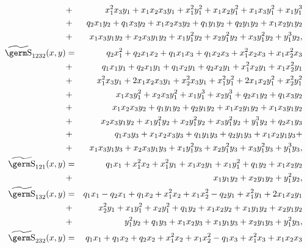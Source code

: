 {{\begin{eqnarray*}
 &+ & x_1^2 x_3 y_1 + 
  x_1 x_2 x_3 y_1 + x_1^2 y_1^2 + 
  x_1 x_2 y_1^2 + x_1 x_3 y_1^2 + x_1 y_1^3 \\ 
 &+ & q_2 x_1 y_2 + 
  q_1 x_3 y_2 + x_1 x_2 x_3 y_2 +  q_1 y_1 y_2 + q_2 y_1 y_2 + 
  x_1 x_2 y_1 y_2\\ 
 &+ & x_1 x_3 y_1 y_2 + 
  x_2 x_3 y_1 y_2 + x_1 y_1^2 y_2 + x_2 y_1^2 y_2 + 
  x_3 y_1^2 y_2 + y_1^3 y_2,\\ 
\wt{\s}_{1232}(x,y) & = & q_2 x_1^2 + q_2 x_1 x_2 + 
  q_1 x_1 x_3 + q_1 x_2 x_3 + 
  x_1^2 x_2 x_3 + x_1 x_2^2 x_3\\ 
 &+ & q_1 x_1 y_1 + q_2 x_1 y_1 + 
  q_1 x_2 y_1 + q_2 x_2 y_1 + x_1^2 x_2 y_1 + x_1 x_2^2 y_1\\ 
 &+ &  x_1^2 x_3 y_1 + 2 x_1 x_2 x_3 y_1 + 
  x_2^2 x_3 y_1 + x_1^2 y_1^2 + 
  2 x_1 x_2 y_1^2 + x_2^2 y_1^2\\ 
 &+ &  x_1 x_3 y_1^2 + x_2 x_3 y_1^2 + x_1 y_1^3 + x_2 y_1^3 + 
  q_2 x_1 y_2 + q_1 x_3 y_2  \\ 
 &+ & x_1 x_2 x_3 y_2 + q_1 y_1 y_2 + 
  q_2 y_1 y_2 + x_1 x_2 y_1 y_2 + 
  x_1 x_3 y_1 y_2  \\ 
 &+ & x_2 x_3 y_1 y_2 + x_1 y_1^2 y_2 + x_2 y_1^2 y_2 + 
  x_3 y_1^2 y_2 + y_1^3 y_2 + 
  q_2 x_1 y_3  \\ 
 &+ & q_1 x_3 y_3 + 
  x_1 x_2 x_3 y_3 + q_1 y_1 y_3 + 
  q_2 y_1 y_3 + x_1 x_2 y_1 y_3 + \\ 
 &+ &  x_1 x_3 y_1 y_3 + 
  x_2 x_3 y_1 y_3 + 
  x_1 y_1^2 y_3 + x_2 y_1^2 y_3 + 
  x_3 y_1^2 y_3 + y_1^3 y_3, \\ 
\wt{\s}_{121}(x,y) & = & q_1 x_1 + x_1^2 x_2 + x_1^2 y_1 + 
  x_1 x_2 y_1 + x_1 y_1^2 + 
  q_1 y_2 + x_1 x_2 y_2 \\ 
 &+ & x_1 y_1 y_2 + x_2 y_1 y_2 + 
  y_1^2 y_2, \\
\wt{\s}_{132}(x,y) & = & q_1 x_1 - q_2 x_1 + q_1 x_2 + 
  x_1^2 x_2 + x_1 x_2^2 - q_2 y_1 + x_1^2 y_1 + 2 x_1 x_2 y_1\\ 
 &+ &  x_2^2 y_1 + x_1 y_1^2 + 
  x_2 y_1^2 + q_1 y_2 +  x_1 x_2 y_2 + x_1 y_1 y_2 + 
  x_2 y_1 y_2\\ 
 &+ & y_1^2 y_2 + 
  q_1 y_3 +  x_1 x_2 y_3 + x_1 y_1 y_3 + x_2 y_1 y_3 + 
  y_1^2 y_3, \\
\wt{\s}_{232}(x,y) & = & q_1 x_1 + q_1 x_2 + q_2 x_2 + 
 x_1^2 x_2 + x_1 x_2^2 - q_1 x_3 +  x_1^2 x_3 + x_1 x_2 x_3\\ 

\end{eqnarray*}}}
